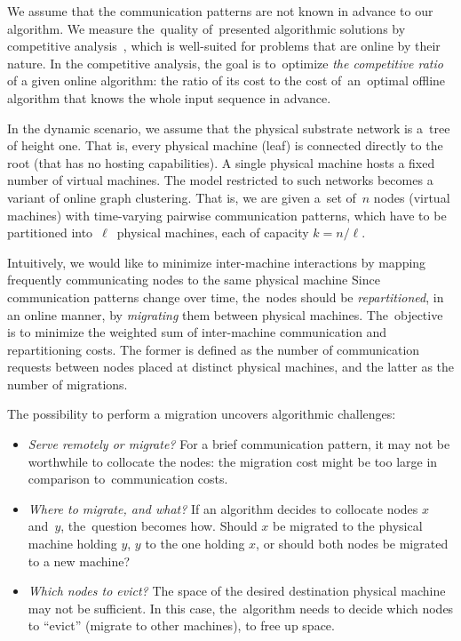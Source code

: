 We assume that the communication patterns are not known in advance to our algorithm.
We measure the~quality of~presented algorithmic solutions by competitive analysis~\cite{borodin-book}, which is well-suited for problems that are online by their nature.
In the competitive analysis, the goal is to~optimize \emph{the competitive ratio} of a given online algorithm: the ratio of its cost to the cost of~an~optimal offline algorithm that knows the whole input sequence in advance.

In the dynamic scenario, we assume that the physical substrate network is a~tree of height one.
That is, every physical machine (leaf) is connected directly to the root (that has no hosting capabilities).
A single physical machine hosts a fixed number of virtual machines.
The model restricted to such networks becomes a variant of online graph clustering.
That is, we are given a~set of~$n$ nodes (virtual machines) with time-varying pairwise
communication patterns, which have to be partitioned into~$\ell$~physical machines, each of
capacity $k=n/\ell$.

Intuitively, we would like to minimize inter-machine
interactions by mapping frequently communicating nodes to the same physical machine
Since communication patterns change over time, the~nodes should be \emph{repartitioned}, in
an online manner, by \emph{migrating} them between physical machines.
The~objective is to minimize the weighted sum of inter-machine communication and repartitioning costs.
The former is defined as the number of communication requests between nodes placed at distinct physical machines, and the latter as the number of migrations.


The possibility to perform a migration uncovers algorithmic challenges:
\begin{itemize}

\item \emph{Serve remotely or migrate?} For a brief communication
pattern, it may not be worthwhile to collocate the nodes: the migration cost might
be too large in comparison to~communication costs.

\item \emph{Where to migrate, and what?}
If an algorithm decides to collocate nodes $x$ and~$y$, the~question becomes
how. Should $x$ be migrated to the physical machine holding $y$, $y$ to the one holding
$x$, or should both nodes be migrated to a new machine?

\item \emph{Which nodes to evict?}
The space of the desired destination physical machine may not be sufficient. In
this case, the~algorithm needs to decide which nodes to ``evict'' (migrate to
other machines), to free up space.

\end{itemize}

